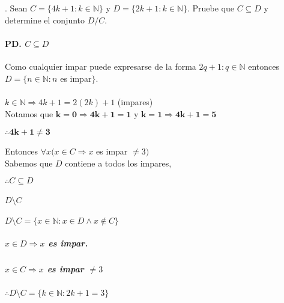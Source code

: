 \section{}
. Sean $C = \{4k+1 : k \in \mathbb{N}\}$ y $D = \{2k+1 : k \in \mathbb{N}\}$. Pruebe que $C \subseteq D$ y determine el conjunto $D/C$.

\paragraph{PD. $C \subseteq D$\\}

Como cualquier impar puede expresarse de la forma $2q + 1 : q \in \mathbb{N}$ entonces $D = \{n \in \mathbb{N} : n$ es impar$\}$.\\
\\
$ k \in \mathbb{N} \Rightarrow 4k + 1 = 2(2k) + 1$ (impares)\\

Notamos que $\mathbf{k = 0 \Rightarrow 4k + 1 = 1}$ y $\mathbf{k = 1 \Rightarrow 4k + 1 = 5}$
	\begin{center}
$\mathbf{\therefore 4k + 1 \neq 3}$\\
	\end{center}
Entonces $\forall x(x \in C \Rightarrow x$ es impar $\neq 3)$\\

Sabemos que $D$ contiene a todos los impares,\\ 
	
	\begin{center}
$\therefore C \subseteq D$
	\end{center}
	
\paragraph{$D \setminus C$\\}
$D \setminus C = \{x \in \mathbb{N} : x \in D \wedge x \notin C\}$\\
\subparagraph{$x \in D \Rightarrow x$ es impar.}
\subparagraph{$x \in C \Rightarrow x$ es impar $\neq 3$}
\begin{center}
$\therefore D \setminus C = \{k \in \mathbb{N} : 2k + 1 = 3\}$
\end{center}